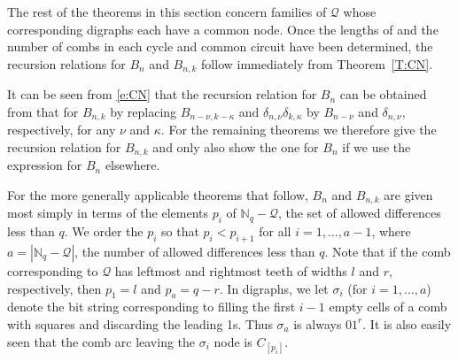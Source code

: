 \documentclass[preprint,3p]{elsarticle}
\newcommand{\abs}[1]{\left\lvert#1\right\rvert}
\providecommand{\Nset}{\mathbb{N}}
\begin{document}
The rest of the theorems in this section concern families of
$\mathcal{Q}$ whose corresponding digraphs each have a common
node. Once the lengths of and the number of combs in each cycle and
common circuit have been determined, the recursion relations for $B_n$
and $B_{n,k}$ follow immediately from Theorem~\ref{T:CN}.

It can be seen from \eqref{e:CN} that the
recursion relation for $B_n$ can be obtained from that for $B_{n,k}$
by replacing $B_{n-\nu,k-\kappa}$ and
$\delta_{n,\nu}\delta_{k,\kappa}$ by $B_{n-\nu}$ and $\delta_{n,\nu}$,
respectively, for any $\nu$ and $\kappa$. For the remaining theorems
we therefore give the recursion relation for $B_{n,k}$ and only also
show the one for $B_n$ if we use the expression for $B_n$ elsewhere.

For the more generally applicable theorems that follow,
$B_n$ and $B_{n,k}$ are given most simply in terms of the elements
$p_i$ of $\Nset_q-\mathcal{Q}$, the set of allowed differences less
than $q$. We order the $p_i$ so that $p_i<p_{i+1}$ for all
$i=1,\ldots,a-1$, where $a=\abs{\Nset_q-\mathcal{Q}}$, the number of
allowed differences less than $q$. Note that if the comb corresponding
to $\mathcal{Q}$ has leftmost and rightmost teeth of widths $l$ and
$r$, respectively, then $p_1=l$ and $p_a=q-r$.  In digraphs, we let
$\sigma_i$ (for $i=1,\ldots,a$) denote the bit string corresponding to
filling the first $i-1$ empty cells of a comb with squares and
discarding the leading 1s. Thus $\sigma_a$ is always $01^r$.  It is
also easily seen that the comb arc leaving the $\sigma_i$ node is
$C_{[p_i]}$.
\end{document}
